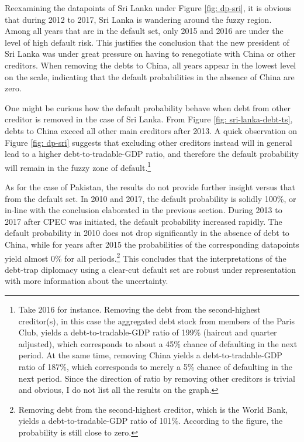 Reexamining the datapoints of Sri Lanka under Figure \ref{fig: dp-sri}, it is obvious that during 2012 to 2017, Sri Lanka is wandering around the fuzzy region. Among all years that are in the default set, only 2015 and 2016 are under the level of high default risk. This justifies the conclusion that the new president of Sri Lanka was under great pressure on having to renegotiate with China or other creditors. When removing the debts to China, all years appear in the lowest level on the scale, indicating that the default probabilities in the absence of China are zero.

One might be curious how the default probability behave when debt from other creditor is removed in the case of Sri Lanka. From Figure \ref{fig: sri-lanka-debt-ts}, debts to China exceed all other main creditors after 2013. A quick observation on Figure \ref{fig: dp-sri} suggests that excluding other creditors instead will in general lead to a higher debt-to-tradable-GDP ratio, and therefore the default probability will remain in the fuzzy zone of default.\footnote{%
    Take 2016 for instance. Removing the debt from the second-highest creditor(s), in this case the aggregated debt stock from members of the Paris Club, yields a debt-to-tradable-GDP ratio of 199\% (haircut and quarter adjusted), which corresponds to about a 45\% chance of defaulting in the next period. At the same time, removing China yields a debt-to-tradable-GDP ratio of 187\%, which corresponds to merely a 5\% chance of defaulting in the next period. Since the direction of ratio by removing other creditors is trivial and obvious, I do not list all the results on the graph.
}

As for the case of Pakistan, the results do not provide further insight versus that from the default set. In 2010 and 2017, the default probability is solidly 100\%, or in-line with the conclusion elaborated in the previous section. During 2013 to 2017 after CPEC was initiated, the default probability increased rapidly. The default probability in 2010 does not drop significantly in the absence of debt to China, while for years after 2015 the probabilities of the corresponding datapoints yield almost 0\% for all periods.\footnote{%
    Removing debt from the second-highest creditor, which is the World Bank, yields a debt-to-tradable-GDP ratio of 101\%. According to the figure, the probability is still close to zero.
}
This concludes that the interpretations of the debt-trap diplomacy using a clear-cut default set are robust under representation with more information about the uncertainty.
